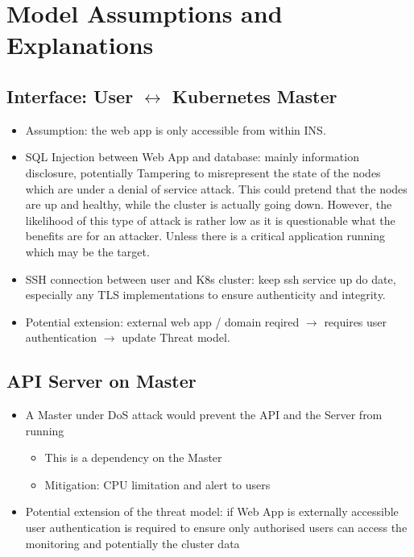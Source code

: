 \section{Model Assumptions and Explanations}

\subsection{Interface: User \(\leftrightarrow\) Kubernetes Master}
\begin{itemize}
    \item Assumption: the web app is only accessible from within INS.
    \item SQL Injection between Web App and database: mainly information disclosure, potentially Tampering to misrepresent the state of the nodes which are under a denial of service attack. This could pretend that the nodes are up and healthy, while the cluster is actually going down. However, the likelihood of this type of attack is rather low as it is questionable what the benefits are for an attacker. Unless there is a critical application running which may be the target.
    \item SSH connection between user and K8s cluster: keep ssh service up do date, especially any TLS implementations to ensure authenticity and integrity.
    \item Potential extension: external web app / domain reqired \(\rightarrow\) requires user authentication \(\rightarrow\) update Threat model.
\end{itemize}

\subsection{API Server on Master}
\begin{itemize}
    \item A Master under DoS attack would prevent the API and the Server from running
        \begin{itemize}
            \item This is a dependency on the Master
            \item Mitigation: CPU limitation and alert to users
        \end{itemize}
    \item Potential extension of the threat model: if Web App is externally accessible user authentication is required to ensure only authorised users can access the monitoring and potentially the cluster data
\end{itemize}


